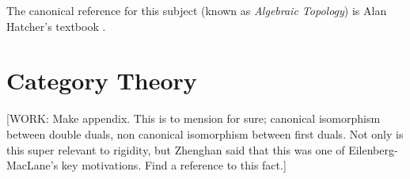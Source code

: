 \documentclass{article}
\theoremstyle{definition}
\numberwithin{figure}{section}
\begin{document}
The canonical reference for this subject (known as \textit{Algebraic Topology}) is Alan Hatcher's textbook \cite{hatcher2005algebraic}.

\section{Category Theory}
\label{Categories}
[WORK: Make appendix. This is to mension for sure; canonical isomorphism between double duals, non canonical isomorphism between first duals. Not only is this super relevant to rigidity, but Zhenghan said that this was one of Eilenberg-MacLane's key motivations. Find a reference to this fact.]




\end{document}
